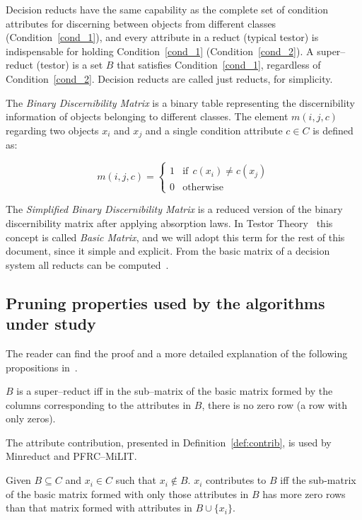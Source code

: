 \documentclass[citenumber]{llncs}
\begin{document}
	Decision reducts have the same capability as the complete set of condition attributes for discerning between objects from different classes (Condition~\ref{cond_1}), and every attribute in a reduct (typical testor) is indispensable for holding Condition~\ref{cond_1} (Condition~\ref{cond_2}). A super--reduct (testor) is a set $B$ that satisfies Condition~\ref{cond_1}, regardless of Condition~\ref{cond_2}. Decision reducts are called just reducts, for simplicity.

	The \textit{Binary Discernibility Matrix} is a binary table representing the discernibility information of objects belonging to different classes. The element $m(i, j, c)$ regarding two objects $x_i$ and $x_j$ and a single condition attribute $c \in C$ is defined as:

	\begin{equation*}
		m(i, j, c)=\left\lbrace\begin{array}{cl}
		1 & \mathrm{if~~}c(x_i) \neq c(x_j) \\
		0 								   & \mathrm{otherwise} 
		\end{array}\right.
	\end{equation*} 

	The \textit{Simplified Binary Discernibility Matrix} is a reduced version of the binary discernibility matrix after applying absorption laws. In Testor Theory~\cite{Lazo01} this concept is called \textit{Basic Matrix}, and we will adopt this term for the rest of this document, since it simple and explicit. From the basic matrix of a decision system all reducts can be computed~\cite{Yao09}.

%	
\subsection{Pruning properties used by the algorithms under study}
%
	The reader can find the proof and a more detailed explanation of the following propositions in~\cite{rodriguez20,Piza20}. 
	
	\begin{definition}\label{def:testor}
		$B$ is a super--reduct iff in the sub--matrix of the basic matrix formed by the columns corresponding to the attributes in $B$, there is no zero row (a row with only zeros).
	\end{definition}
	
	The attribute contribution, presented in Definition~\ref{def:contrib}, is used by Minreduct and PFRC--MiLIT. 	
	
	\begin{definition}\label{def:contrib}
		Given $B \subseteq C$ and $x_i \in C$ such that $x_i \notin B$. $x_i$ contributes to $B$ iff the sub-matrix of the basic matrix formed with only those attributes in $B$ has more zero rows than that matrix formed with attributes in $B \cup \lbrace x_i \rbrace$.
	\end{definition}	
	
\end{document}

